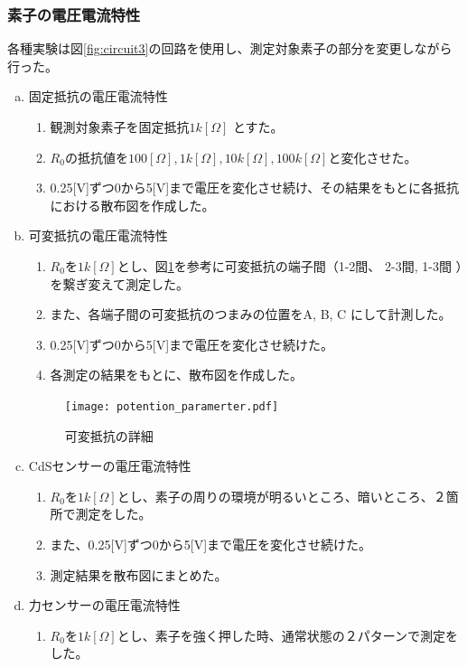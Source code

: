 \documentclass[11pt,dvipdfmx]{jarticle}
\begin{document}
	\subsubsection{素子の電圧電流特性}
	各種実験は図\ref{fig:circuit3}の回路を使用し、測定対象素子の部分を変更しながら行った。
		\begin{enumerate}[a.]
			\item 固定抵抗の電圧電流特性
				\begin{enumerate}[1.]
					\item 観測対象素子を固定抵抗$1k[\Omega]$ とすた。
					\item $R_0$の抵抗値を$100[\Omega], 1k[\Omega], 10k[\Omega], 100k[\Omega]$と変化させた。
					\item 0.25[V]ずつ0から5[V]まで電圧を変化させ続け、その結果をもとに各抵抗における散布図を作成した。
				\end{enumerate}
			\item 可変抵抗の電圧電流特性
				\begin{enumerate}[1.]
					\item $R_0を1k[\Omega]$とし、図\ref{fig:potention}を参考に可変抵抗の端子間（1-2間、 2-3間, 1-3間 ）を繋ぎ変えて測定した。
					\item また、各端子間の可変抵抗のつまみの位置をA, B, C にして計測した。
					\item 0.25[V]ずつ0から5[V]まで電圧を変化させ続けた。
					\item 各測定の結果をもとに、散布図を作成した。
				\end{enumerate}
				\begin{figure}[h]
					\centering
					\texttt{[image: potention\_paramerter.pdf]}
					\caption{可変抵抗の詳細}
					\label{fig:potention}
				\end{figure}
			\item CdSセンサーの電圧電流特性
				\begin{enumerate}[1.]
					\item $R_0を1k[\Omega]$とし、素子の周りの環境が明るいところ、暗いところ、２箇所で測定をした。
					\item また、0.25[V]ずつ0から5[V]まで電圧を変化させ続けた。
					\item 測定結果を散布図にまとめた。 
				\end{enumerate}
			\item 力センサーの電圧電流特性
				\begin{enumerate}[1.]
					\item $R_0を1k[\Omega]$とし、素子を強く押した時、通常状態の２パターンで測定をした。

\end{enumerate}
\end{enumerate}
\end{document}
